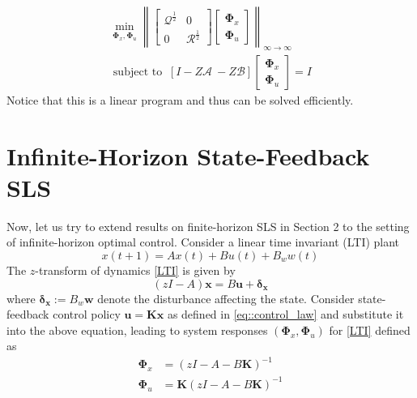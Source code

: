 \documentclass{article}[12pt]
\begin{document}
\begin{equation}
    \begin{array}{c}{\min _{\mathbf{\Phi}_{x}, \mathbf{\Phi}_{u}} \left\|\left[\begin{array}{cc}{\mathcal{Q}^{\frac{1}{2}}} & {0} \\ {0} & {\mathcal{R}^{\frac{1}{2}}}\end{array}\right]\left[\begin{array}{c}{\mathbf{\Phi}_{x}} \\ {\mathbf{\Phi}_{u}}\end{array}\right]  \right\|_{\infty \rightarrow \infty}} \\[0.3cm] {\text { subject to } \  [I-Z \mathcal{A} \ -Z \mathcal{B}]\left[\begin{array}{c}{\mathbf{\Phi}_{x}} \\ {\mathbf{\Phi}_{u}}\end{array}\right]=I}\end{array}
\end{equation}
Notice that this is a linear program and thus can be solved efficiently.


\section{Infinite-Horizon State-Feedback SLS}
Now, let us try to extend results on finite-horizon SLS in Section 2 to the setting of infinite-horizon optimal control. Consider a linear time invariant (LTI) plant
\begin{equation}
\label{LTI}
    x(t+1)=A x(t)+B u(t)+ B_w w(t)
\end{equation}
The $z$-transform of dynamics \eqref{LTI} is given by
\begin{equation}
    (z I-A) \mathbf{x}=B \mathbf{u}+\boldsymbol{\delta}_{\boldsymbol{x}}
\end{equation}
where $\boldsymbol{\delta}_{\boldsymbol{x}}:=B_{w} \mathbf{w}$ denote the disturbance affecting the state.
Consider state-feedback control policy $\mathbf{u}=\mathbf{K x}$ as defined in \eqref{eq::control_law} and substitute it into the above equation, leading to system responses $(\mathbf{\Phi}_{x}, \mathbf{\Phi}_u)$ for \eqref{LTI} defined as 
\begin{equation}
\label{map::inf}
    \begin{aligned} \mathbf{\Phi}_{x} &=\left(z I-A-B \mathbf{K}\right)^{-1} \\ \mathbf{\Phi}_{u} &=\mathbf{K}\left(z I-A-B \mathbf{K}\right)^{-1} \end{aligned}
\end{equation}
\end{document}
